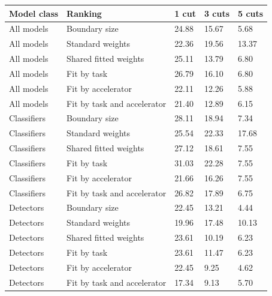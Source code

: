 \begin{tabular}{@{}lllll@{}}
\toprule
Model class & Ranking & 1 cut & 3 cuts & 5 cuts \\
\midrule
All models & Boundary size & 24.88 & 15.67 & 5.68 \\
All models & Standard weights & 22.36 & 19.56 & 13.37 \\
All models & Shared fitted weights & 25.11 & 13.79 & 6.80 \\
All models & Fit by task & 26.79 & 16.10 & 6.80 \\
All models & Fit by accelerator & 22.11 & 12.26 & 5.88 \\
All models & Fit by task and accelerator & 21.40 & 12.89 & 6.15 \\
Classifiers & Boundary size & 28.11 & 18.94 & 7.34 \\
Classifiers & Standard weights & 25.54 & 22.33 & 17.68 \\
Classifiers & Shared fitted weights & 27.12 & 18.61 & 7.55 \\
Classifiers & Fit by task & 31.03 & 22.28 & 7.55 \\
Classifiers & Fit by accelerator & 21.66 & 16.26 & 7.55 \\
Classifiers & Fit by task and accelerator & 26.82 & 17.89 & 6.75 \\
Detectors & Boundary size & 22.45 & 13.21 & 4.44 \\
Detectors & Standard weights & 19.96 & 17.48 & 10.13 \\
Detectors & Shared fitted weights & 23.61 & 10.19 & 6.23 \\
Detectors & Fit by task & 23.61 & 11.47 & 6.23 \\
Detectors & Fit by accelerator & 22.45 & 9.25 & 4.62 \\
Detectors & Fit by task and accelerator & 17.34 & 9.13 & 5.70 \\
\bottomrule
\end{tabular}
